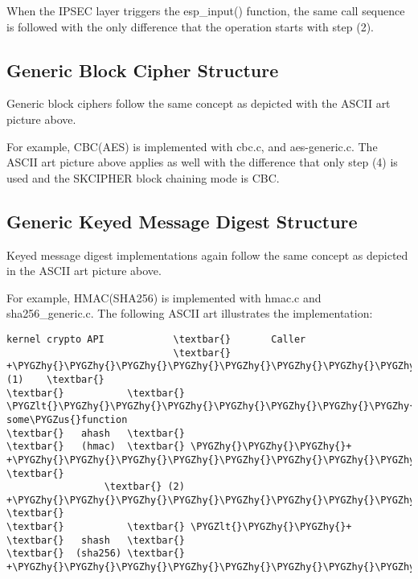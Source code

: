 \documentclass[a4paper,8pt,english]{sphinxmanual}
\def\PYGZus{\char`\_}
\def\PYGZlt{\char`\<}
\def\PYGZhy{\char`\-}
\begin{document}
When the IPSEC layer triggers the esp\_input() function, the same call
sequence is followed with the only difference that the operation starts
with step (2).


\subsection{Generic Block Cipher Structure}
\label{crypto/architecture:generic-block-cipher-structure}
Generic block ciphers follow the same concept as depicted with the ASCII
art picture above.

For example, CBC(AES) is implemented with cbc.c, and aes-generic.c. The
ASCII art picture above applies as well with the difference that only
step (4) is used and the SKCIPHER block chaining mode is CBC.


\subsection{Generic Keyed Message Digest Structure}
\label{crypto/architecture:generic-keyed-message-digest-structure}
Keyed message digest implementations again follow the same concept as
depicted in the ASCII art picture above.

For example, HMAC(SHA256) is implemented with hmac.c and
sha256\_generic.c. The following ASCII art illustrates the
implementation:

\begin{Verbatim}[commandchars=\\\{\}]
kernel crypto API            \textbar{}       Caller
                             \textbar{}
+\PYGZhy{}\PYGZhy{}\PYGZhy{}\PYGZhy{}\PYGZhy{}\PYGZhy{}\PYGZhy{}\PYGZhy{}\PYGZhy{}\PYGZhy{}\PYGZhy{}+         (1)    \textbar{}
\textbar{}           \textbar{} \PYGZlt{}\PYGZhy{}\PYGZhy{}\PYGZhy{}\PYGZhy{}\PYGZhy{}\PYGZhy{}\PYGZhy{}\PYGZhy{}\PYGZhy{}\PYGZhy{}\PYGZhy{}\PYGZhy{}\PYGZhy{}\PYGZhy{}\PYGZhy{}\PYGZhy{}\PYGZhy{}\PYGZhy{}  some\PYGZus{}function
\textbar{}   ahash   \textbar{}
\textbar{}   (hmac)  \textbar{} \PYGZhy{}\PYGZhy{}\PYGZhy{}+
+\PYGZhy{}\PYGZhy{}\PYGZhy{}\PYGZhy{}\PYGZhy{}\PYGZhy{}\PYGZhy{}\PYGZhy{}\PYGZhy{}\PYGZhy{}\PYGZhy{}+    \textbar{}
                 \textbar{} (2)
+\PYGZhy{}\PYGZhy{}\PYGZhy{}\PYGZhy{}\PYGZhy{}\PYGZhy{}\PYGZhy{}\PYGZhy{}\PYGZhy{}\PYGZhy{}\PYGZhy{}+    \textbar{}
\textbar{}           \textbar{} \PYGZlt{}\PYGZhy{}\PYGZhy{}+
\textbar{}   shash   \textbar{}
\textbar{}  (sha256) \textbar{}
+\PYGZhy{}\PYGZhy{}\PYGZhy{}\PYGZhy{}\PYGZhy{}\PYGZhy{}\PYGZhy{}\PYGZhy{}\PYGZhy{}\PYGZhy{}\PYGZhy{}+
\end{Verbatim}
\end{document}
